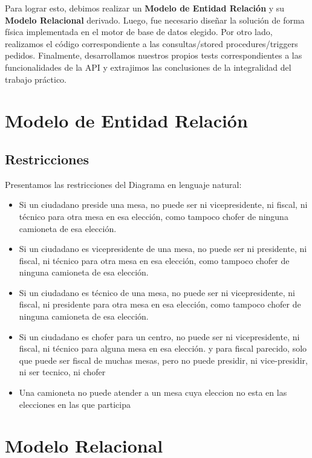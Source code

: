 \documentclass[10pt,a4paper]{article}
\begin{document}
Para lograr esto, debimos realizar un \textbf{Modelo de Entidad Relación} y su \textbf{Modelo Relacional} derivado. Luego, fue necesario diseñar la solución de forma física implementada en el motor de base de datos elegido. Por otro lado, realizamos el código correspondiente a las consultas/stored procedures/triggers pedidos. Finalmente, desarrollamos nuestros propios tests correspondientes a las funcionalidades de la API y extrajimos las conclusiones de la integralidad del trabajo práctico.
\newpage
\section{Modelo de Entidad Relación}

%

\subsection{Restricciones}
Presentamos las restricciones del Diagrama en lenguaje natural:
\begin{itemize}
\item Si un ciudadano preside una mesa, no puede ser ni vicepresidente, ni fiscal, ni técnico para otra mesa en esa elección, como tampoco chofer de ninguna camioneta de esa elección.
\item Si un ciudadano es vicepresidente de una mesa, no puede ser ni presidente, ni fiscal, ni técnico para otra mesa en esa elección, como tampoco chofer de ninguna camioneta de esa elección.
\item Si un ciudadano es técnico de una mesa, no puede ser ni vicepresidente, ni fiscal, ni presidente para otra mesa en esa elección, como tampoco chofer de ninguna camioneta de esa elección.
\item Si un ciudadano es chofer para un centro, no puede ser ni vicepresidente, ni fiscal, ni técnico para alguna mesa en esa elección.
y para fiscal parecido, solo que puede ser fiscal de muchas mesas, pero no puede presidir, ni vice-presidir, ni ser tecnico, ni chofer
\item Una camioneta no puede atender a un mesa cuya eleccion no esta en las elecciones en las que participa
\end{itemize}
\newpage
\section{Modelo Relacional}

\newpage
\end{document}
